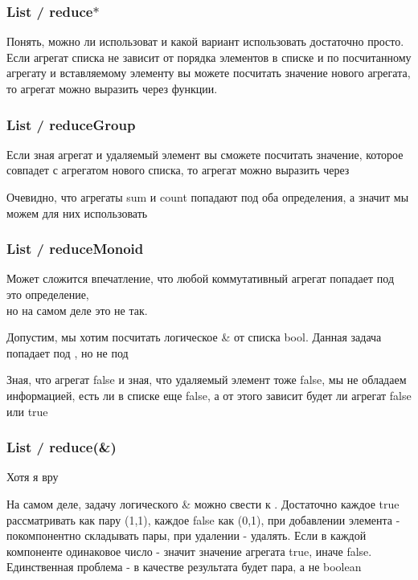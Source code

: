 \documentclass[xetex]{beamer}
\begin{document}
\begin{frame}[fragile]
\frametitle{List / reduce$\ast$}
Понять, можно ли использоват \quad и какой вариант использовать достаточно просто. Если агрегат списка не зависит от порядка элементов в списке и по посчитанному агрегату и вставляемому элементу вы можете посчитать значение нового агрегата, то агрегат можно выразить через \quad функции.
\end{frame}


\begin{frame}[fragile]
\frametitle{List / reduceGroup}
Если зная агрегат и удаляемый элемент вы сможете посчитать значение, которое совпадет с агрегатом нового списка, то агрегат можно выразить через 

\vspace{10mm}
Очевидно, что агрегаты sum и count попадают под оба определения, а значит мы можем для них использовать 
\end{frame}


\begin{frame}[fragile]
\frametitle{List / reduceMonoid}
Может сложится впечатление, что любой коммутативный агрегат попадает под это определение, \\ но на самом деле это не так. 

\vspace{6mm}
Допустим, мы хотим посчитать логическое \& от списка bool. Данная задача попадает под \quad, но не под 

\vspace{6mm}
{\color{comments-color} Зная, что агрегат false и зная, что удаляемый элемент тоже false, мы не обладаем информацией, есть ли в списке еще false, а от этого зависит будет ли агрегат false или true}
\end{frame}


\begin{frame}[fragile]
\frametitle{List / reduce(\&)}
Хотя я вру

\vspace{10mm}
На самом деле, задачу логического \& можно свести к . Достаточно каждое true рассматривать как пару (1,1), каждое false как (0,1), при добавлении элемента - покомпонентно складывать пары, при удалении - удалять. Если в каждой компоненте одинаковое число - значит значение агрегата true, иначе false. Единственная проблема - в качестве результата будет пара, а не boolean
\end{frame}
\end{document}
